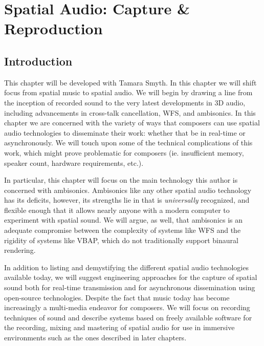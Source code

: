 \chapter{Spatial Audio: Capture \& Reproduction}


\section{Introduction}

This chapter will be developed with Tamara Smyth. In this chapter we will shift focus from spatial music to spatial audio. We will begin by drawing a line from the inception of recorded sound to the very latest developments in 3D audio, including advancements in cross-talk cancellation, WFS, and ambisonics. In this chapter we are concerned with the variety of ways that composers can use spatial audio technologies to disseminate their work: whether that be in real-time or asynchronously. We will touch upon some of the technical complications of this work, which might prove problematic for composers (ie. insufficient memory, speaker count, hardware requirements, etc.).

In particular, this chapter will focus on the main technology this author is concerned with ambisonics. Ambisonics like any other spatial audio technology has its deficits, however, its strengths lie in that is \textit{universally} recognized, and flexible enough that it allows nearly anyone with a modern computer to experiment with spatial sound. We will argue, as well, that ambisonics is an adequate compromise between the complexity of systems like WFS and the rigidity of systems like VBAP, which do not traditionally support binaural rendering.

In addition to listing and demystifying the different spatial audio technologies available today, we will suggest engineering approaches for the capture of spatial sound both for real-time transmission and for asynchronous dissemination using open-source technologies. Despite the fact that music today has become increasingly a multi-media endeavor for composers. We will focus on recording techniques of sound and describe systems based on freely available software for the recording, mixing and mastering of spatial audio for use in immersive environments such as the ones described in later chapters.

